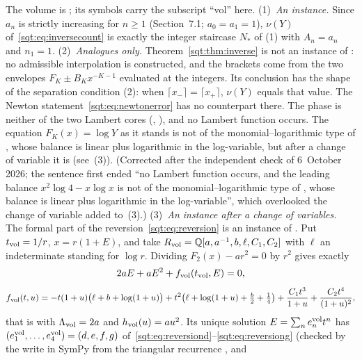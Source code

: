 \begin{remark}\label{sqt:rem:transseries}
The volume is
;
its symbols carry the subscript ``vol'' here.
(1)~\emph{An instance.} Since $a_n$ is strictly increasing for $n\ge1$
(Section~7.1; $a_0=a_1=1$), $\nu(Y)$ of~\eqref{sqt:eq:inversecount} is
exactly the integer staircase $N_\ast$ of (1)
with $A_n=a_n$ and $n_1=1$.
(2)~\emph{Analogues only.} Theorem~\ref{sqt:thm:inverse} is not an instance
of : no admissible interpolation is constructed, and
the brackets come from the two envelopes
$F_K\pm B_Kx^{-K-1}$ evaluated at the integers. Its conclusion has the shape
of the separation condition (2): when
$\lceil x_-\rceil=\lceil x_+\rceil$, $\nu(Y)$ equals that value. The Newton
statement~\eqref{sqt:eq:newtonerror} has no counterpart there. The phase is
neither of the two Lambert cores (,
), and no Lambert function occurs. The
equation $F_K(x)=\log Y$ as it stands is not of the monomial--logarithmic
type of , whose balance is linear plus logarithmic
in the log-variable, but after a change of variable it is (see~(3)).
\textup{(Corrected after the independent check of 6~October 2026; the
sentence first ended ``no Lambert function occurs, and the leading balance
$x^2\log4-x\log x$ is not of the monomial--logarithmic type of
, whose balance is linear plus logarithmic in the
log-variable'', which overlooked the change of variable added to~(3).)}
(3)~\emph{An instance after a change of variables.} The formal part of the
reversion~\eqref{sqt:eq:reversion} is an instance of
. Put $t_{\rm vol}=1/r$, $x=r(1+E)$, and take
$R_{\rm vol}=\mathbb Q[a,a^{-1},b,\ell,C_1,C_2]$ with $\ell$ an
indeterminate standing for $\log r$. Dividing $F_2(x)-ar^2=0$ by $r^2$ gives
exactly
\[
 2aE+aE^2+f_{\rm vol}(t_{\rm vol},E)=0,
\]
\[
 f_{\rm vol}(t,u)=-t(1+u)\bigl(\ell+b+\log(1+u)\bigr)
  +t^2\bigl(\ell+\log(1+u)+\tfrac b2+\tfrac14\bigr)
  +\frac{C_1t^3}{1+u}+\frac{C_2t^4}{(1+u)^2},
\]
that is  with $\Lambda_{\rm vol}=2a$ and
$h_{\rm vol}(u)=au^2$. Its unique solution $E=\sum_ne_n^{\rm vol}t^n$ has
$(e_1^{\rm vol},\ldots,e_4^{\rm vol})=(d,e,f,g)$
of~\eqref{sqt:eq:reversiond}--\eqref{sqt:eq:reversiong} (checked by the write
in SymPy from the triangular recurrence , and

\end{remark}
